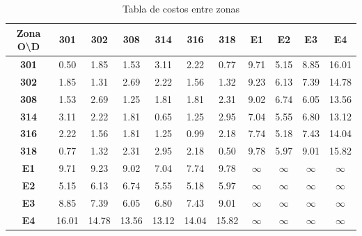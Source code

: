 \documentclass[letterpaper,12pt]{article}
\begin{document}
\begin{table}[h!]
    \centering
    \begin{tabular}{c|cccccccccc}
    \textbf{Zona O\textbackslash D} & \textbf{301} & \textbf{302} & \textbf{308} & \textbf{314} & \textbf{316} & \textbf{318} & \textbf{E1} & \textbf{E2} & \textbf{E3} & \textbf{E4} \\ \hline
    \textbf{301} & 0.50 & 1.85 & 1.53 & 3.11 & 2.22 & 0.77 & 9.71 & 5.15 & 8.85 & 16.01 \\ 
    \textbf{302} & 1.85 & 1.31 & 2.69 & 2.22 & 1.56 & 1.32 & 9.23 & 6.13 & 7.39 & 14.78 \\ 
    \textbf{308} & 1.53 & 2.69 & 1.25 & 1.81 & 1.81 & 2.31 & 9.02 & 6.74 & 6.05 & 13.56 \\ 
    \textbf{314} & 3.11 & 2.22 & 1.81 & 0.65 & 1.25 & 2.95 & 7.04 & 5.55 & 6.80 & 13.12 \\ 
    \textbf{316} & 2.22 & 1.56 & 1.81 & 1.25 & 0.99 & 2.18 & 7.74 & 5.18 & 7.43 & 14.04 \\ 
    \textbf{318} & 0.77 & 1.32 & 2.31 & 2.95 & 2.18 & 0.50 & 9.78 & 5.97 & 9.01 & 15.82 \\ 
    \textbf{E1} & 9.71 & 9.23 & 9.02 & 7.04 & 7.74 & 9.78 & $\infty$ & $\infty$ & $\infty$ & $\infty$ \\ 
    \textbf{E2} & 5.15 & 6.13 & 6.74 & 5.55 & 5.18 & 5.97 & $\infty$ & $\infty$ & $\infty$ & $\infty$ \\ 
    \textbf{E3} & 8.85 & 7.39 & 6.05 & 6.80 & 7.43 & 9.01 & $\infty$ & $\infty$ & $\infty$ & $\infty$ \\ 
    \textbf{E4} & 16.01 & 14.78 & 13.56 & 13.12 & 14.04 & 15.82 & $\infty$ & $\infty$ & $\infty$ & $\infty$ \\ 
    \end{tabular}
    \caption{Tabla de costos entre zonas}
    \label{table:costs_zones}
\end{table}
\end{document}
